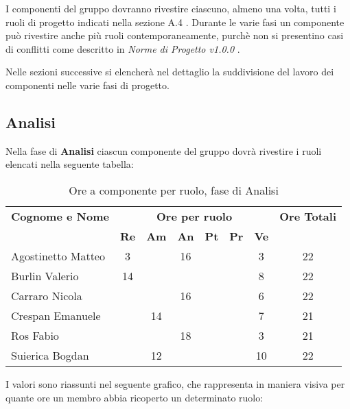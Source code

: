 I componenti del gruppo dovranno rivestire ciascuno, almeno una volta, tutti i ruoli di progetto indicati nella sezione A.4 . Durante le varie fasi un componente può rivestire anche più ruoli contemporaneamente, purchè non si presentino casi di conflitti come descritto in \textit{Norme di Progetto v1.0.0} .

\noindent Nelle sezioni successive si elencherà nel dettaglio la suddivisione del lavoro dei componenti nelle varie fasi di progetto.

\subsection{Analisi}
Nella fase di \textbf{Analisi} ciascun componente del gruppo dovrà rivestire i ruoli elencati nella seguente tabella:

\begin{table}[h]
\centering
\begin{tabular}{|l|c|c|c|c|c|c|c|}
\toprule
	\textbf{Cognome e Nome} & \multicolumn{6}{c}{\textbf{Ore per ruolo}} & \textbf{Ore Totali} \\
	& \textbf{Re} & \textbf{Am} & \textbf{An} & \textbf{Pt} & \textbf{Pr} & \textbf{Ve} & \\
	 
\midrule
	Agostinetto Matteo & 3 & & 16 & & & 3 & 22 \\
	Burlin Valerio & 14 & & & & & 8 & 22 \\ 
	Carraro Nicola & & & 16 & & & 6 & 22 \\
	Crespan Emanuele & & 14 & & & & 7 & 21 \\
	Ros Fabio & & & 18 & & & 3 & 21 \\
	Suierica Bogdan & & 12 & & & & 10 & 22 \\

\bottomrule
\end{tabular}
\caption{Ore a componente per ruolo, fase di Analisi}
\end{table}

\noindent I valori sono riassunti nel seguente grafico, che rappresenta in maniera visiva per quante ore un membro abbia ricoperto un determinato ruolo:


